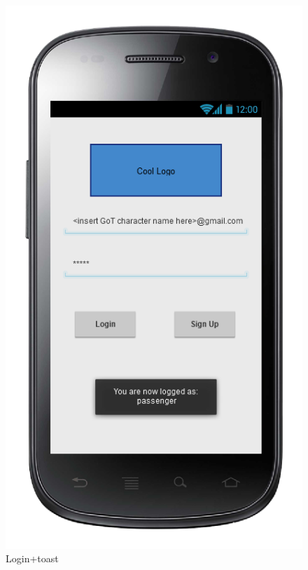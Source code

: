 \begin{figure} [h]
\centering
  	  \includegraphics[scale=0.5]{ui/Login + toast.png}
\caption{Login+toast}
    
	\end{figure}
